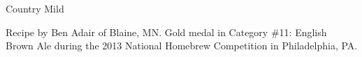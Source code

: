 \begin{recipe}{Country Mild}

\begin{aboutblock}
Recipe by Ben Adair of Blaine, MN. Gold medal in Category \#11: English Brown Ale
during the 2013 National Homebrew Competition in Philadelphia, PA.
\sourceaha
\end{aboutblock}


\begin{methodandtiming}

\begin{mashsteps}
\end{mashsteps}

\begin{fermentationsteps}
\end{fermentationsteps}

\end{methodandtiming}

\recipebreak

\begin{ingredientsblock}

\begin{malts}

\end{malts}

\begin{hops}
\end{hops}


\end{ingredientsblock}

\end{recipe}

